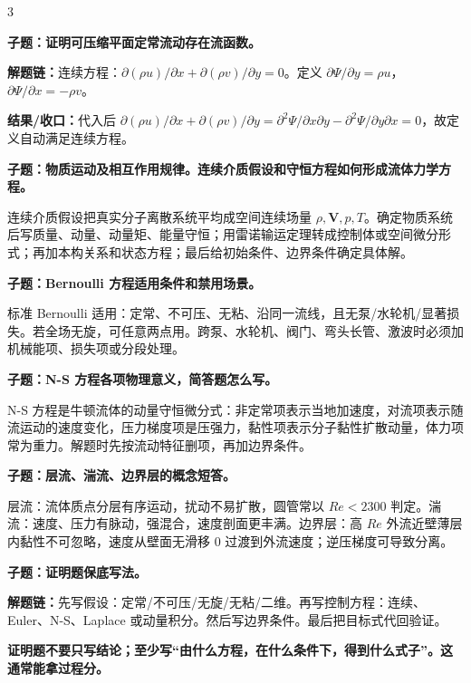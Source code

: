 \documentclass[a4paper]{article}
\newcommand{\qt}[1]{\vspace{0.04pt}\colorbox{Q}{\parbox{\dimexpr\linewidth-2\fboxsep}{\color{white}\bfseries #1}}\par}
\newcommand{\ans}[1]{\colorbox{G}{\parbox{\dimexpr\linewidth-2\fboxsep}{#1}}\par}
\newcommand{\warn}[1]{\colorbox{Y}{\parbox{\dimexpr\linewidth-2\fboxsep}{\color{E}\bfseries #1}}\par}
\newcommand{\chain}[1]{{\color{A}\bfseries 解题链：}#1\par}
\newcommand{\res}[1]{{\color{E}\bfseries 结果/收口：}#1\par}
\begin{document}
\begin{multicols}{3}
\qt{子题：证明可压缩平面定常流动存在流函数。}
\chain{连续方程：$\partial(\rho u)/\partial x+\partial(\rho v)/\partial y=0$。定义 $\partial\Psi/\partial y=\rho u$，$\partial\Psi/\partial x=-\rho v$。}
\res{代入后 $\partial(\rho u)/\partial x+\partial(\rho v)/\partial y=\partial^2\Psi/\partial x\partial y-\partial^2\Psi/\partial y\partial x=0$，故定义自动满足连续方程。}

\qt{子题：物质运动及相互作用规律。连续介质假设和守恒方程如何形成流体力学方程。}
\ans{连续介质假设把真实分子离散系统平均成空间连续场量 $\rho,\bm V,p,T$。确定物质系统后写质量、动量、动量矩、能量守恒；用雷诺输运定理转成控制体或空间微分形式；再加本构关系和状态方程；最后给初始条件、边界条件确定具体解。}

\qt{子题：Bernoulli 方程适用条件和禁用场景。}
\ans{标准 Bernoulli 适用：定常、不可压、无粘、沿同一流线，且无泵/水轮机/显著损失。若全场无旋，可任意两点用。跨泵、水轮机、阀门、弯头长管、激波时必须加机械能项、损失项或分段处理。}

\qt{子题：N-S 方程各项物理意义，简答题怎么写。}
\ans{N-S 方程是牛顿流体的动量守恒微分式：非定常项表示当地加速度，对流项表示随流运动的速度变化，压力梯度项是压强力，黏性项表示分子黏性扩散动量，体力项常为重力。解题时先按流动特征删项，再加边界条件。}

\qt{子题：层流、湍流、边界层的概念短答。}
\ans{层流：流体质点分层有序运动，扰动不易扩散，圆管常以 $Re<2300$ 判定。湍流：速度、压力有脉动，强混合，速度剖面更丰满。边界层：高 $Re$ 外流近壁薄层内黏性不可忽略，速度从壁面无滑移 0 过渡到外流速度；逆压梯度可导致分离。}

\qt{子题：证明题保底写法。}
\chain{先写假设：定常/不可压/无旋/无粘/二维。再写控制方程：连续、Euler、N-S、Laplace 或动量积分。然后写边界条件。最后把目标式代回验证。}
\warn{证明题不要只写结论；至少写“由什么方程，在什么条件下，得到什么式子”。这通常能拿过程分。}



\end{multicols}
\end{document}
